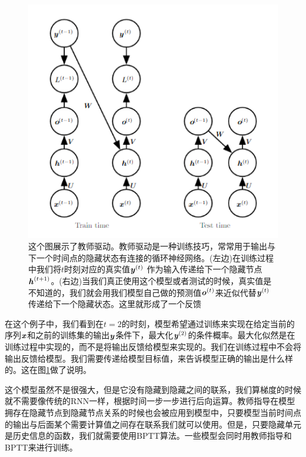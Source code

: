 \begin{figure}[htbp] %
   \centering
   \includegraphics[width=6in]{fig/chap10/10_6.PNG} 
   \caption{ 这个图展示了教师驱动。教师驱动是一种训练技巧，常常用于输出与下一个时间点的隐藏状态有连接的循环神经网络。(左边)在训练过程中我们将$t$时刻对应的真实值$\boldsymbol{\mathit{y}}^{(t)}$ 作为输入传递给下一个隐藏节点$\boldsymbol{\mathit{h}}^{(t+1)}$。(右边)当我们真正使用这个模型或者测试的时候，真实值是不知道的，我们就会用我们模型自己做的预测值$\boldsymbol{\mathit{o}}^{(t)}$来近似代替$\boldsymbol{\mathit{y}}^{(t)}$传递给下一个隐藏状态。这里就形成了一个反馈}
   \label{fig:10_6}
\end{figure}
在这个例子中，我们看到在$t=2$的时刻，模型希望通过训练来实现在给定当前的序列$\boldsymbol{\mathit{x}}$和之前的训练集的输出$\boldsymbol{\mathit{y}}$条件下，最大化$\boldsymbol{\mathit{y}}^{(2)}$的条件概率。最大化似然是在训练过程中实现的，而不是将输出反馈给模型来实现的。我们在训练过程中不会将输出反馈给模型。我们需要传递给模型目标值，来告诉模型正确的输出是什么样的。这在图\ref{fig:10_6}做了说明。

这个模型虽然不是很强大，但是它没有隐藏到隐藏之间的联系，我们算梯度的时候就不需要像传统的RNN一样，根据时间一步一步进行后向运算。教师指导在模型拥存在隐藏节点到隐藏节点关系的时候也会被应用到模型中，只要模型当前时间点的输出与后面某个需要计算值之间存在联系我们就可以使用。但是，只要隐藏单元是历史信息的函数，我们就需要使用BPTT算法。一些模型会同时用教师指导和BPTT来进行训练。

